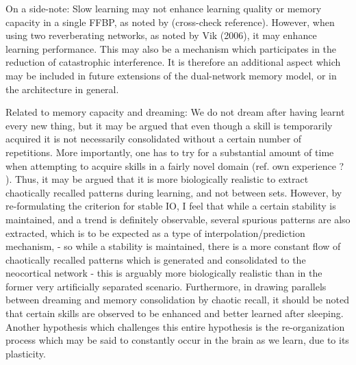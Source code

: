 On a side-note: Slow learning may not enhance learning quality or memory capacity in a single FFBP, as noted by \cite{Ans1997} (cross-check reference). However, when using two reverberating networks, as noted by Vik (2006), it may enhance learning performance. This may also be a mechanism which participates in the reduction of catastrophic interference. It is therefore an additional aspect which may be included in future extensions of the dual-network memory model, or in the architecture in general.

Related to memory capacity and dreaming: We do not dream after having learnt every new thing, but it may be argued that even though a skill is temporarily acquired it is not necessarily consolidated without a certain number of repetitions. More importantly, one has to try for a substantial amount of time when attempting to acquire skills in a fairly novel domain (ref. own experience ? ). Thus, it may be argued that it is more biologically realistic to extract chaotically recalled patterns during learning, and not between sets. However, by re-formulating the criterion for stable IO, I feel that while a certain stability is maintained, and a trend is definitely observable, several spurious patterns are also extracted, which is to be expected as a type of interpolation/prediction mechanism, - so while a stability is maintained, there is a more constant flow of chaotically recalled patterns which is generated and consolidated to the neocortical network - this is arguably more biologically realistic than in the former very artificially separated scenario.
Furthermore, in drawing parallels between dreaming and memory consolidation by chaotic recall, it should be noted that certain skills are observed to be enhanced and better learned after sleeping. Another hypothesis which challenges this entire hypothesis is the re-organization process which may be said to constantly occur in the brain as we learn, due to its plasticity.

